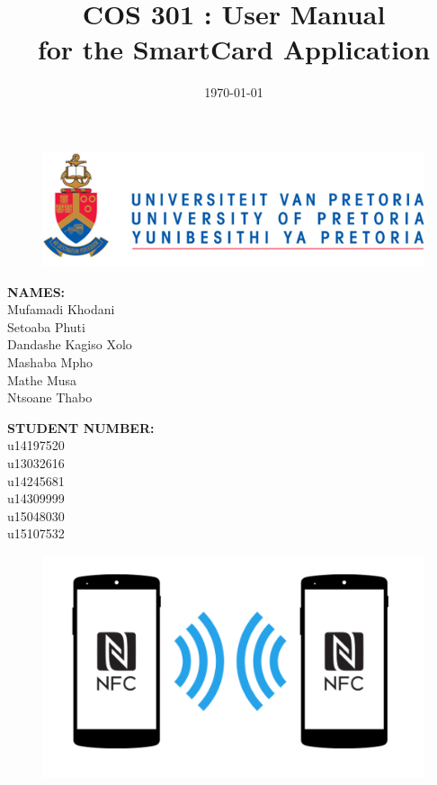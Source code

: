 \documentclass[english]{article}
\title{COS 301 : User Manual\\
	for the SmartCard Application\\
	}
\date{\today}
\begin{document}
	\maketitle
	\begin{figure}[!t]
		\includegraphics{up_logo.png}
	\end{figure}
	\begin{minipage}{0.4\textwidth}
		\begin{flushleft} \large
			\textbf{NAMES:}\\[0.4cm]
			Mufamadi {Khodani} \\
			Setoaba {Phuti} \\
			Dandashe {Kagiso Xolo} \\
			Mashaba {Mpho} \\
			Mathe {Musa} \\
			Ntsoane {Thabo}\\
		\end{flushleft}
	\end{minipage}
	\begin{minipage}{0.4\textwidth}
		\begin{flushright} \large
			\textbf{STUDENT NUMBER:} \\[0.4cm]
			u14197520 \\
			u13032616 \\
			u14245681 \\
			u14309999 \\
			u15048030 \\
			u15107532 \\
		\end{flushright}
\end{minipage}

	
	\newpage

	\tableofcontents
	

	
\newpage
	\begin{figure}[!t]
		\centering
		\includegraphics[scale=0.6]{NFC.png}
	\end{figure}
\end{document}
